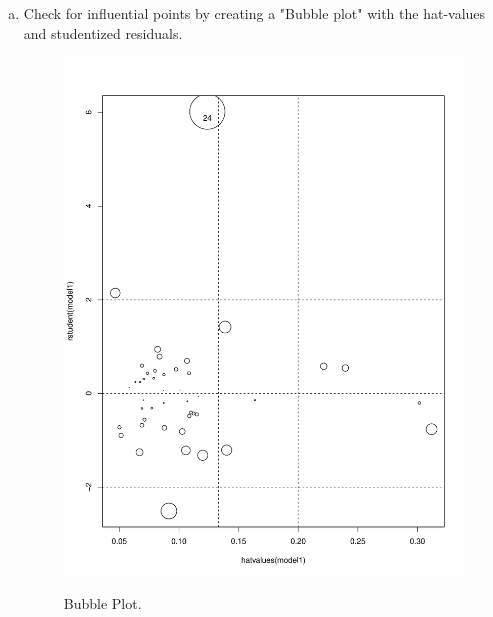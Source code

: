 \documentclass[12pt,letterpaper]{article}
\begin{document}
\begin{enumerate}[(a)]
	\item Check for influential points by creating a "Bubble plot" with the hat-values and studentized residuals.
	
	  
	
	 \begin{figure}[h!]\centering
		\caption{\footnotesize Bubble Plot.
		}\vspace{-1cm}
		\label{fig:plot1_e}
		\includegraphics[width=.55\textwidth]{bubble_plot_labeled.pdf}\\
	\end{figure}
\end{enumerate}
\end{document}
